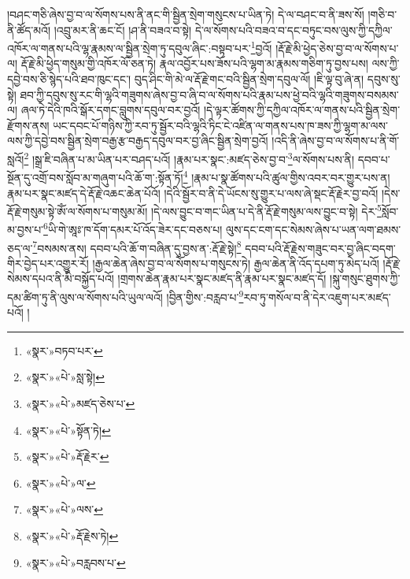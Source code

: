 །བཤང་གཅི་ཞེས་བྱ་བ་ལ་སོགས་པས་ནི་ནང་གི་སྦྱིན་སྲེག་གསུངས་པ་ཡིན་ཏེ། དེ་ལ་བཤང་བ་ནི་ཟས་སོ། །གཅི་བ་ནི་ཚོད་མའོ། །འབྲུ་མར་ནི་ཆང་ངོ། །ཤ་ནི་བཟའ་བ་སྟེ། དེ་ལ་སོགས་པའི་བཟའ་བ་དང་བཏུང་བས་ལུས་ཀྱི་དཀྱིལ་འཁོར་ལ་གནས་པའི་ལྷ་རྣམས་ལ་སྦྱིན་སྲེག་ཏུ་དབུལ་ཞིང་:བསྟབ་པར་\footnote{«སྣར་»བཏབ་པར་}བྱའོ། །རྡོ་རྗེ་མི་ཕྱེད་ཅེས་བྱ་བ་ལ་སོགས་པ་ལ། རྡོ་རྗེ་མི་ཕྱེད་གསུམ་གྱི་འཁོར་ལོ་ཅན་ཏེ། རྣལ་འབྱོར་པས་ཟོས་པའི་ལྷག་མ་རྣམས་གཅིག་ཏུ་བྱས་པས། ལས་ཀྱི་དབྱེ་བས་ཅི་སྙེད་པའི་ཐབ་ཁུང་དང་། བུད་ཤིང་གི་མེ་ལ་རྡོ་རྗེ་གང་བའི་སྦྱིན་སྲེག་དབུལ་ལོ། །ཇི་ལྟ་བུ་ཞེ་ན། དབུས་སུ་སྟེ། ཐབ་ཀྱི་དབུས་སུ་རང་གི་ལྷའི་གཟུགས་ཞེས་བྱ་བ་ཞི་བ་ལ་སོགས་པའི་རྣམ་པས་ཕྱེ་བའི་ལྷའི་གཟུགས་བསམས་ལ། ཞལ་ཏེ་དེའི་ཁའི་སྒོར་དགང་བླུགས་དབུལ་བར་བྱའོ། །དེ་ལྟར་ཚོགས་ཀྱི་དཀྱིལ་འཁོར་ལ་གནས་པའི་སྦྱིན་སྲེག་རྫོགས་ནས། ཡང་དབང་པོ་གཉིས་ཀྱི་རབ་ཏུ་སྦྱོར་བའི་ལྷའི་ཏིང་ངེ་འཛིན་ལ་གནས་པས་ཁ་ཟས་ཀྱི་ལྷག་མ་ལས་ལས་ཀྱི་དབྱེ་བས་སྦྱིན་སྲེག་བརྒྱ་རྩ་བརྒྱད་དབུལ་བར་བྱ་ཞིང་སྦྱིན་སྲེག་བྱའོ། །འདི་ནི་ཞེས་བྱ་བ་ལ་སོགས་པ་ནི་གོ་སླའོ།\footnote{«སྣར་»«པེ་»སླ་སྟེ།} །སྒྲ་ཇི་བཞིན་པ་མ་ཡིན་པར་བཤད་པའོ། །རྣམ་པར་སྣང་:མཛད་ཅེས་བྱ་བ་\footnote{«སྣར་»«པེ་»མཛད་ཅེས་པ་}ལ་སོགས་པས་ནི། དབབ་པ་སྔོན་དུ་འགྲོ་བས་སློབ་མ་གཞུག་པའི་ཆོ་ག་:སྟོན་ཏོ།\footnote{«སྣར་»«པེ་»སྟོན་ཏེ།} །རྣམ་པ་སྣ་ཚོགས་པའི་ཚུལ་གྱིས་འབར་བར་གྱུར་པས་ན། རྣམ་པར་སྣང་མཛད་དེ་རྡོ་རྗེ་འཆང་ཆེན་པོའོ། །དེའི་སྦྱོར་བ་ནི་དེ་ཡོངས་སུ་གྱུར་པ་ལས་ཞེ་སྡང་རྡོ་རྗེར་བྱ་བའོ། །དེས་རྡོ་རྗེ་གསུམ་སྟེ་ཨོཾ་ལ་སོགས་པ་གསུམ་མོ། །དེ་ལས་བྱུང་བ་གང་ཡིན་པ་དེ་ནི་རྡོ་རྗེ་གསུམ་ལས་བྱུང་བ་སྟེ། དེར་\footnote{«སྣར་»«པེ་»རྡོ་རྗེར་}སློབ་མ་བྱས་པ་\footnote{«སྣར་»«པེ་»ལ་}ཡི་གེ་ཨཱཿ་ཁ་དོག་དམར་པོ་འོད་ཟེར་དང་བཅས་པ། ལུས་དང་ངག་དང་སེམས་ཞེས་པ་ཡན་ལག་ཐམས་ཅད་ལ་\footnote{«སྣར་»«པེ་»ལས་}བསམས་ནས། དབབ་པའི་ཆོ་ག་བཞིན་དུ་བྱས་ན་:རྡོ་རྗེ་སྟེ།\footnote{«སྣར་»«པེ་»རྡོ་རྗེས་ཏེ།} དབབ་པའི་རྡོ་རྗེས་གཟུང་བར་བྱ་ཞིང་བདག་གིར་བྱེད་པར་འགྱུར་རོ། །རྒྱལ་ཆེན་ཞེས་བྱ་བ་ལ་སོགས་པ་གསུངས་ཏེ། རྒྱལ་ཆེན་ནི་འོད་དཔག་ཏུ་མེད་པའོ། །རྡོ་རྗེ་སེམས་དཔའ་ནི་མི་བསྐྱོད་པའོ། །གྲགས་ཆེན་རྣམ་པར་སྣང་མཛད་ནི་རྣམ་པར་སྣང་མཛད་དོ། །སྐུ་གསུང་ཐུགས་ཀྱི་དམ་ཚིག་ཏུ་ནི་ལུས་ལ་སོགས་པའི་ཡུལ་ལའོ། །བྱིན་གྱིས་:བརླབ་པ་\footnote{«སྣར་»«པེ་»བརླབས་པ་}རབ་ཏུ་གསོལ་བ་ནི་དེར་འཇུག་པར་མཛད་པའོ། །
